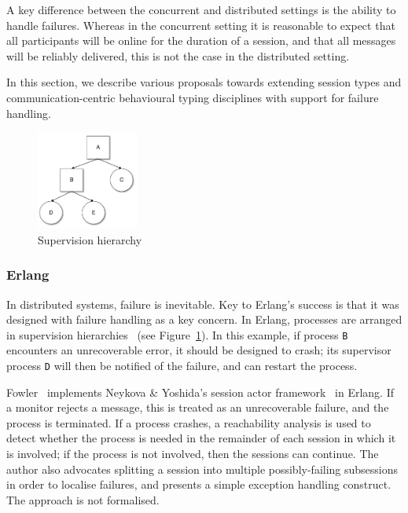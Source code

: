 \documentclass[
graybox,
envcountchap
]{svmult}
\begin{document}
\begin{bibunit}
  A key difference between the concurrent and distributed settings is the
  ability to handle failures. Whereas in the concurrent setting it is reasonable
  to expect that all participants will be online for the duration of a session,
  and that all messages will be reliably delivered, this is not the case in the
  distributed setting.

  In this section, we describe various proposals towards extending session types
  and communication-centric behavioural typing disciplines with support for
  failure handling.

  \begin{figure}[t]
    \centering
    \includegraphics[width=0.3\textwidth]{img/SupervisionTree.pdf}
    \caption{Supervision hierarchy}
    \label{fig:bt:supervision}
  \end{figure}

  \subsubsection{Erlang}
  In distributed systems, failure is inevitable. Key to Erlang's success is that
  it was  designed with failure handling as a key concern. In Erlang, processes
  are arranged in supervision hierarchies~\cite{Armstrong03:thesis} (see
  Figure~\ref{fig:bt:supervision}). In this example, if process \texttt{B}
  encounters an unrecoverable error, it should be designed to crash; its
  supervisor process \texttt{D} will then be notified of the failure, and can
  restart the process.

  Fowler~\cite{Fowler16:actors} implements Neykova \& Yoshida's session actor
  framework~\cite{NeykovaY16:sactor} in Erlang. If a monitor rejects a message,
  this is treated as an unrecoverable failure, and the process is terminated.
  If a process crashes, a reachability analysis is used to detect whether the
  process is needed in the remainder of each session in which it is involved; if
  the process is not involved, then the sessions can continue. The author also
  advocates splitting a session into multiple possibly-failing subsessions in
  order to localise failures, and presents a simple exception handling
  construct. The approach is not formalised.


\end{bibunit}
\end{document}
